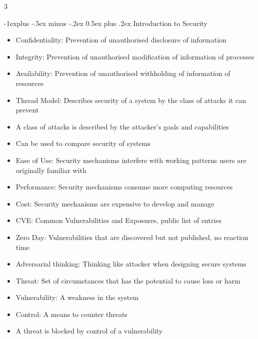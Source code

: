 \documentclass[10pt, landscape]{article}
\makeatletter
\renewcommand{\section}{\@startsection{section}{1}{0mm}%
                                {-1ex plus -.5ex minus -.2ex}%
                                {0.5ex plus .2ex}%
                                {\normalfont\large\bfseries}}
\renewcommand{\section}{\@startsection{section}{2}{0mm}%
                                {-1explus -.5ex minus -.2ex}%
                                {0.5ex plus .2ex}%
                                {\normalfont\normalsize\bfseries}}
\makeatother
\begin{document}
\raggedright
\footnotesize
\begin{multicols*}{3}

\setlength{\columnseprule}{0.25pt}
\setlength{\premulticols}{1pt}
\setlength{\postmulticols}{1pt}
\setlength{\multicolsep}{1pt}
\setlength{\columnsep}{2pt}

\begin{center}
\end{center}

\section{Introduction to Security}
\begin{itemize}
    \item Confidentiality: Prevention of unauthorised disclosure of information
    \item Integrity: Prevention of unauthorised modification of information of processes
    \item Availability: Prevention of unauthorised withholding of information of resources
    \item Thread Model: Describes security of a system by the class of attacks it can prevent
    \item A class of attacks is described by the attacker's goals and capabilities
    \item Can be used to compare security of systems
    \item Ease of Use: Security mechanisms interfere with working patterns users are originally familiar with
    \item Performance: Security mechanisms consume more computing resources
    \item Cost: Security mechanisms are expensive to develop and manage
    \item CVE: Common Vulnerabilities and Exposures, public list of entries
    \item Zero Day: Vulnerabilities that are discovered but not published, no reaction time
    \item Adversarial thinking: Thinking like attacker when designing secure systems
    \item Threat: Set of circumstances that has the potential to cause loss or harm
    \item Vulnerability: A weakness in the system
    \item Control: A means to counter threats
    \item A threat is blocked by control of a vulnerability
\end{itemize}


\end{multicols*}
\end{document}
